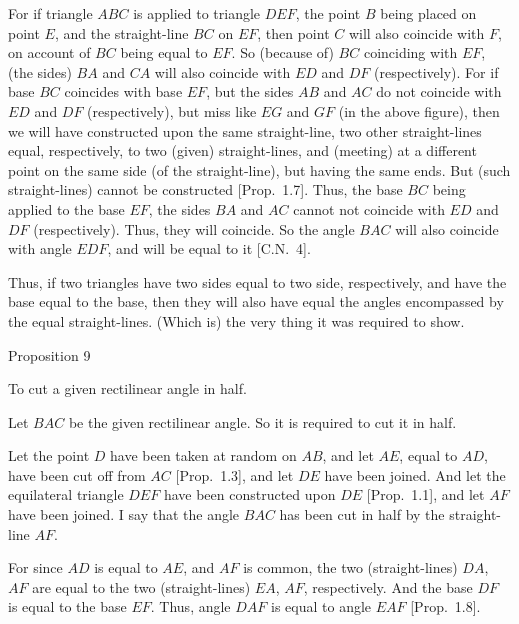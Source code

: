 For if triangle $ABC$ is applied to triangle $DEF$, the point $B$ being placed on
point $E$, and the straight-line $BC$ on $EF$, then point $C$ will also coincide with $F$, on
account of $BC$ being equal to $EF$.
So  (because of) $BC$ coinciding with $EF$,  (the sides) $BA$ and $CA$ will also
coincide with  $ED$ and $DF$ (respectively). 
For if base $BC$ coincides with base $EF$, but the sides $AB$ and $AC$ 
do not coincide with $ED$ and $DF$ (respectively), but miss like $EG$
and $GF$ (in the above figure), 
then we will have constructed upon the same straight-line, two other straight-lines equal, respectively, to two (given) straight-lines,  and (meeting)
at a different point on the same
side (of the straight-line), but having the same ends. But (such straight-lines) cannot be constructed [Prop.~1.7].
Thus,  the base $BC$ being applied to the  base $EF$,  the sides $BA$ and $AC$
cannot not coincide with $ED$ and $DF$ (respectively). Thus, they
will coincide. So the angle $BAC$ will also coincide with angle $EDF$,
and will be equal to it [C.N.~4].

Thus, if two triangles have  two  sides equal to two side, respectively,
and  have the base equal to the base, then they will also have equal the angles  encompassed by
the equal straight-lines. (Which is) the very thing it was required to show.


\begin{center}
{\large Proposition 9}
\end{center}

To cut a given rectilinear angle in half.

\epsfysize=2.5in
\centerline{}

Let $BAC$ be the given rectilinear angle. So it is required to
cut it in half.

Let the point $D$ have been taken at random on $AB$,
and let $AE$, equal to $AD$,  have been cut off from $AC$  [Prop.~1.3], and
let $DE$ have been joined. And let the equilateral triangle $DEF$
have been constructed upon $DE$ [Prop.~1.1], and let $AF$ have been
joined. I say that the angle $BAC$ has been cut in half by the straight-line
$AF$.

For since $AD$ is equal to  $AE$, and $AF$ is common, the two (straight-lines) $DA$,
$AF$ are equal to the two (straight-lines) $EA$, $AF$, respectively. And the base $DF$
is equal to the base $EF$. Thus, angle $DAF$ is equal to angle $EAF$ [Prop.~1.8].

